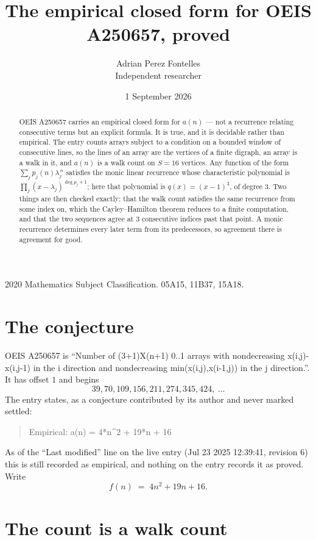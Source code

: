\documentclass[11pt,a4paper]{article}
\title{The empirical closed form for OEIS A250657, proved}
\author{Adrian Perez Fontelles\\ \small Independent researcher}
\date{1 September 2026}
\theoremstyle{plain}
\theoremstyle{definition}
\begin{document}
\maketitle

\begin{abstract}
OEIS A250657 carries an empirical closed form for $a(n)$ --- not a recurrence relating
consecutive terms but an explicit formula. It is true, and it is decidable rather than
empirical. The entry counts arrays subject to a condition on a bounded window of consecutive lines, so the lines of an array are the
vertices of a finite digraph, an array is a walk in it, and $a(n)$ is a walk count on
$S=16$ vertices. Any function of the form $\sum_j p_j(n)\lambda_j^{\,n}$ satisfies the
monic linear recurrence whose characteristic polynomial is
$\prod_j(x-\lambda_j)^{\deg p_j+1}$; here that polynomial is $q(x)=(x-1)^{3}$, of degree
$3$. Two things are then checked exactly: that the walk count satisfies the same
recurrence from some index on, which the Cayley--Hamilton theorem reduces to a finite
computation, and that the two sequences agree at $3$ consecutive indices past that
point. A monic recurrence determines every later term from its predecessors, so agreement
there is agreement for good.
\end{abstract}

\noindent\small 2020 Mathematics Subject Classification. 05A15, 11B37, 15A18.\normalsize

\section{The conjecture}

OEIS A250657 is ``Number of (3+1)X(n+1) 0..1 arrays with nondecreasing x(i,j)-x(i,j-1) in the i direction and nondecreasing min(x(i,j),x(i-1,j)) in the j direction.''. It has offset $1$ and begins
\[
39, 70, 109, 156, 211, 274, 345, 424,\ \dots
\]
The entry states, as a conjecture contributed by its author and never marked settled:
\begin{quote}
Empirical: a(n) = 4*n\^{}2 + 19*n + 16
\end{quote}
As of the ``Last modified'' line on the live entry (Jul 23 2025 12:39:41, revision 6) this is still
recorded as empirical, and nothing on the entry records it as proved. Write
\[
f(n)\;=\;4 n^{2} + 19 n + 16.
\]

\section{The count is a walk count}
\end{document}
